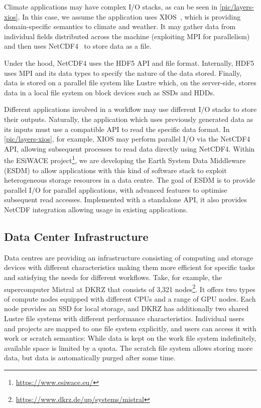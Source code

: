 \documentclass{superfri}
\begin{document}


Climate applications may have complex I/O stacks, as can be seen in \cref{pic/layers-xios}.
In this case, we assume the application uses XIOS~\cite{xios}, which is providing domain-specific semantics to climate and weather.
It may gather data from individual fields distributed across the machine (exploiting MPI for parallelism) and then uses NetCDF4~\cite{netcdf} to store data as a file.

Under the hood, NetCDF4 uses the HDF5 API and file format.
Internally, HDF5 uses MPI and its data types to specify the nature of the data stored.
Finally, data is stored on a parallel file system like Lustre which, on the server-side, stores data in a local file system on block devices such as SSDs and HDDs.

Different applications involved in a workflow may use different I/O stacks to store their outputs.
Naturally, the application which uses previously generated data as its inputs must use a compatible API to read the specific data format.
In \cref{pic/layers-xios}, for example, XIOS may perform parallel I/O via the NetCDF4 API, allowing subsequent processes to read data directly using NetCDF4.
Within the ESiWACE project\footnote{\url{https://www.esiwace.eu/}}, we are developing the Earth System Data Middleware (ESDM)\cite{esdm} to allow applications with this kind of software stack to exploit heterogeneous storage resources in a data centre.
The goal of ESDM is to provide parallel I/O for parallel applications, with advanced features to optimise subsequent read accesses.
Implemented with a standalone API, it also provides NetCDF integration allowing usage in existing applications.

\subsection{Data Center Infrastructure}

Data centres are providing an infrastructure consisting of computing and storage devices with different characteristics making them more efficient for specific tasks and satisfying the needs for different workflows.
Take, for example, the supercomputer Mistral at DKRZ that consists of 3,321 nodes\footnote{\url{https://www.dkrz.de/up/systems/mistral}}.
It offers two types of compute nodes equipped with different CPUs and a range of GPU nodes.
Each node provides an SSD for local storage, and DKRZ has additionally two shared Lustre file systems with different performance characteristics.
Individual users and projects are mapped to one file system explicitly, and users can access it with work or scratch semantics:
While data is kept on the work file system indefinitely, available space is limited by a quota.
The scratch file system allows storing more data, but data is automatically purged after some time.
\end{document}
